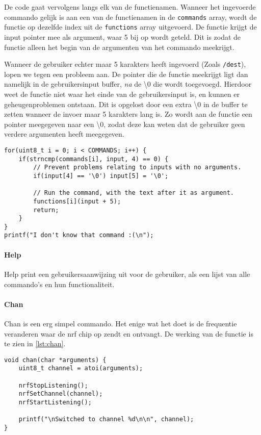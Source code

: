 De code gaat vervolgens langs elk van de functienamen. Wanneer het ingevoerde commando gelijk is aan een van de functienamen in de \texttt{commands} array, wordt de functie op dezelfde index uit de \texttt{functions} array uitgevoerd. De functie krijgt de input pointer mee als argument, waar 5 bij op wordt geteld. Dit is zodat de functie alleen het begin van de argumenten van het commando meekrijgt.

Wanneer de gebruiker echter maar 5 karakters heeft ingevoerd (Zoals \texttt{/dest}), lopen we tegen een probleem aan. De pointer die de functie meekrijgt ligt dan namelijk in de gebruikersinput buffer, \textit{na} de \textbackslash0 die wordt toegevoegd. Hierdoor weet de functie niet waar het einde van de gebruikersinput is, en kunnen er geheugenproblemen ontstaan. Dit is opgelost door een extra \textbackslash0 in de buffer te zetten wanneer de invoer maar 5 karakters lang is. Zo wordt aan de functie een pointer meegegeven naar een \textbackslash0, zodat deze kan weten dat de gebruiker geen verdere argumenten heeft meegegeven.

\begin{lstlisting}[caption={De code die het ingevoerde commando als functie uitvoert},captionpos=b,label={lst:interpretInputRun},style=c,xleftmargin=.\textwidth,xrightmargin=.\textwidth]
for(uint8_t i = 0; i < COMMANDS; i++) {
    if(strncmp(commands[i], input, 4) == 0) {
        // Prevent problems relating to inputs with no arguments.
        if(input[4] == '\0') input[5] = '\0';

        // Run the command, with the text after it as argument.
        functions[i](input + 5);
        return;
    }
}
printf("I don't know that command :(\n");
\end{lstlisting}



\paragraph*{Help}
Help print een gebruikersaanwijzing uit voor de gebruiker, als een lijst van alle commando's en hun functionaliteit.

\paragraph*{Chan}
Chan is een erg simpel commando. Het enige wat het doet is de frequentie veranderen waar de nrf chip op zendt en ontvangt. De werking van de functie is te zien in \autoref{lst:chan}.
\begin{lstlisting}[caption={De chan functie},captionpos=b,label={lst:chan},style=c,xleftmargin=.\textwidth,xrightmargin=.\textwidth]
void chan(char *arguments) {
    uint8_t channel = atoi(arguments);

    nrfStopListening();
    nrfSetChannel(channel);
    nrfStartListening();

    printf("\nSwitched to channel %d\n\n", channel);
}
\end{lstlisting}

